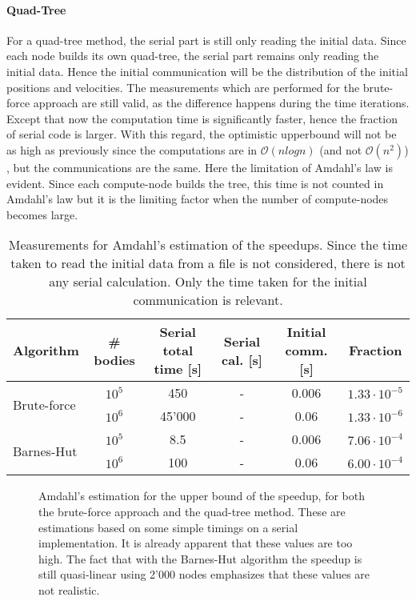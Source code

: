 \paragraph{Quad-Tree}
For a quad-tree method, the serial part is still only reading the initial data. Since each node builds its own quad-tree, the serial part remains only reading the initial data. Hence the initial communication will be the distribution of the initial positions and velocities. The measurements which are performed for the brute-force approach are still valid, as the difference happens during the time iterations. Except that now the computation time is significantly faster, hence the fraction of serial code is larger.  With this regard, the optimistic upperbound will not be as high as previously since the computations are in $\mathcal{O}(nlogn)$ (and not $\mathcal{O}(n^2)$) , but the communications are the same. Here the limitation of Amdahl's law is evident. Since each compute-node builds the tree, this time is not counted in Amdahl's law but it is the limiting factor when the number of compute-nodes becomes large.

\begin{table}[H]
\centering
\begin{tabular}{l|ccccc}
Algorithm                    & \# bodies & Serial total time [s] & Serial cal. [s] & Initial comm. [s] & Fraction \\
\hline\multirow{2}{*}{Brute-force} & $10^5$    & 450  & - & 0.006 &$1.33\cdot 10^{-5}$\\
                             & $10^6$    & 45'000& - & 0.06  &$1.33\cdot 10^{-6}$\\     
\multirow{2}{*}{Barnes-Hut}  & $10^5$    & 8.5  & - & 0.006 &$7.06\cdot 10^{-4}$\\
                             & $10^6$    & 100  & - & 0.06  &$6.00\cdot 10^{-4}$\\
\end{tabular}
\caption{Measurements for Amdahl's estimation of the speedups. Since the time taken to read the initial data from a file is not considered, there is not any serial calculation. Only the time taken for the initial communication is relevant.}
\label{tab:amdahl}
\end{table}

\begin{figure}[H]

\caption{Amdahl's estimation for the upper bound of the speedup, for both the brute-force approach and the quad-tree method. These are estimations based on some simple timings on a serial implementation. It is already apparent that these values are too high. The fact that with the Barnes-Hut algorithm the speedup is still quasi-linear using 2'000 nodes emphasizes that these values are not realistic.}
\label{fig:amdahl}
\end{figure}


